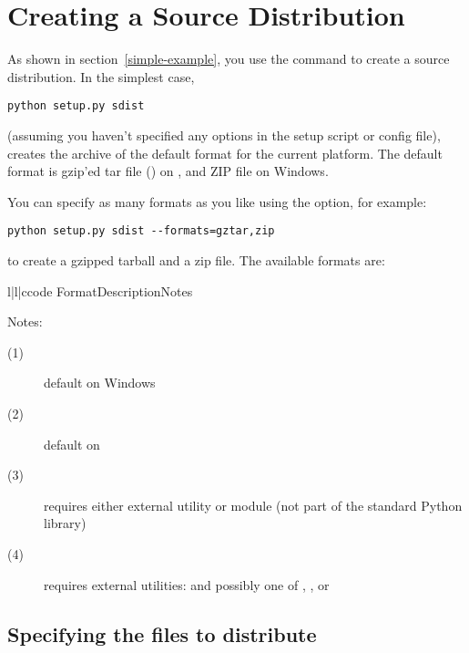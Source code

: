 \documentclass{howto}
\begin{document}
\section{Creating a Source Distribution}
\label{source-dist}

As shown in section~\ref{simple-example}, you use the
 command to create a source distribution.  In the
simplest case,
\begin{verbatim}
python setup.py sdist
\end{verbatim}
(assuming you haven't specified any  options in the setup
script or config file),  creates the archive of the
default format for the current platform.  The default format is gzip'ed
tar file () on \UNIX, and ZIP file on Windows.

You can specify as many formats as you like using the
 option, for example:
\begin{verbatim}
python setup.py sdist --formats=gztar,zip
\end{verbatim}
to create a gzipped tarball and a zip file.  The available formats are:
\begin{tableiii}{l|l|c}{code}%
  {Format}{Description}{Notes}
\end{tableiii}

\noindent Notes:
\begin{description}
\item[(1)] default on Windows
\item[(2)] default on \UNIX
\item[(3)] requires either external  utility or
   module (not part of the standard Python library)
\item[(4)] requires external utilities:  and possibly one
  of , , or 
\end{description}



\subsection{Specifying the files to distribute}
\label{manifest}
\end{document}
